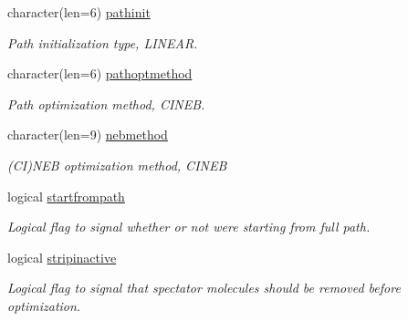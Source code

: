 \begin{DoxyCompactItemize}
character(len=6) \mbox{\hyperlink{namespaceglobaldata_a45ebfde17dc1300b187dd31f32218b83}{pathinit}}
\begin{DoxyCompactList}\small\item\em Path initialization type, L\+I\+N\+E\+AR. \end{DoxyCompactList}\item 
\mbox{\label{namespaceglobaldata_a937d27bc1c79065037c714e77a9b5b9a}} 
character(len=6) \mbox{\hyperlink{namespaceglobaldata_a937d27bc1c79065037c714e77a9b5b9a}{pathoptmethod}}
\begin{DoxyCompactList}\small\item\em Path optimization method, C\+I\+N\+EB. \end{DoxyCompactList}\item 
\mbox{\label{namespaceglobaldata_a2e366abea660511550cb2fe32860d54a}} 
character(len=9) \mbox{\hyperlink{namespaceglobaldata_a2e366abea660511550cb2fe32860d54a}{nebmethod}}
\begin{DoxyCompactList}\small\item\em (CI)N\+EB optimization method, C\+I\+N\+EB \end{DoxyCompactList}\item 
\mbox{\label{namespaceglobaldata_a7f70855279bb4ff76b27b3d6c83b70ba}} 
logical \mbox{\hyperlink{namespaceglobaldata_a7f70855279bb4ff76b27b3d6c83b70ba}{startfrompath}}
\begin{DoxyCompactList}\small\item\em Logical flag to signal whether or not we\textquotesingle{}re starting from full path. \end{DoxyCompactList}\item 
\mbox{\label{namespaceglobaldata_a7aeccf1be55c54d9dd70725804962233}} 
logical \mbox{\hyperlink{namespaceglobaldata_a7aeccf1be55c54d9dd70725804962233}{stripinactive}}
\begin{DoxyCompactList}\small\item\em Logical flag to signal that spectator molecules should be removed before optimization. \end{DoxyCompactList}\item 
\mbox{\label{namespaceglobaldata_a56183a6a94e829385365e8cd4636798a}} 

\end{DoxyCompactItemize}

